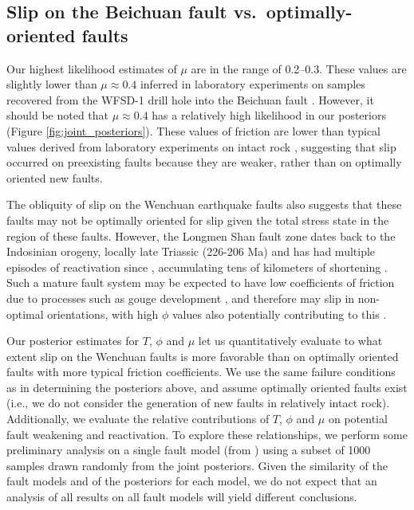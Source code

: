 \documentclass[draft,jgrga]{AGUTeX}
\begin{document}
\begin{article}
\subsection{Slip on the Beichuan fault vs.~optimally-oriented
faults}\label{slip-on-the-beichuan-fault-vs.optimally-oriented-faults}

Our highest likelihood estimates of $\mu$ are in the range of 0.2--0.3.
These values are slightly lower than $\mu \approx 0.4$ inferred in
laboratory experiments on samples recovered from the WFSD-1 drill hole
into the Beichuan fault \citep{kuo2014}. However, it should be noted that
$\mu \approx 0.4$ has a relatively high likelihood in our posteriors
(Figure \ref{fig:joint_posteriors}). These values of friction 
are lower than typical values derived from laboratory experiments on
intact rock \citep[e.g.,][]{byerlee1978}, suggesting that slip occurred on
preexisting faults because they are weaker, rather than on optimally oriented
new faults.

The obliquity of slip on the Wenchuan earthquake faults also suggests
that these faults may not be optimally oriented for slip given the total
stress state in the region of these faults. However, the Longmen Shan
fault zone dates back to the Indosinian orogeny, locally late Triassic
(226-206 Ma) \citep{yong2003} and has had multiple episodes of
reactivation since \citep[e.g.,][]{burchfiel1995, wang2012}, accumulating
tens of kilometers of shortening \citep[e.g.,][]{hubbard2010}. Such a mature
fault system may be expected to have low coefficients of friction due to
processes such as gouge development \citep[e.g.,][]{kuo2014}, and therefore
may slip in non-optimal orientations, with high $\phi$ values also
potentially contributing to this \citep[e.g.,][]{sibson1985}.

Our posterior estimates for $T$, $\phi$ and $\mu$ let us quantitatively
evaluate to what extent slip on the Wenchuan faults is more favorable
than on optimally oriented faults with more typical friction
coefficients. We use the same failure conditions as in determining the
posteriors above, and assume optimally oriented faults exist
(i.e., we do not consider the generation of new faults in relatively 
intact rock).
Additionally, we evaluate the relative contributions of $T$, $\phi$ and
$\mu$ on potential fault weakening and reactivation. To explore these
relationships, we perform some preliminary analysis on a single fault
model (from \citet{zhang2011}) using a subset of 1000
samples drawn randomly from the joint posteriors. Given the similarity
of the fault models and of the posteriors for each model, we do not
expect that an analysis of all results on all fault models will yield
different conclusions.


\end{article}
\end{document}
